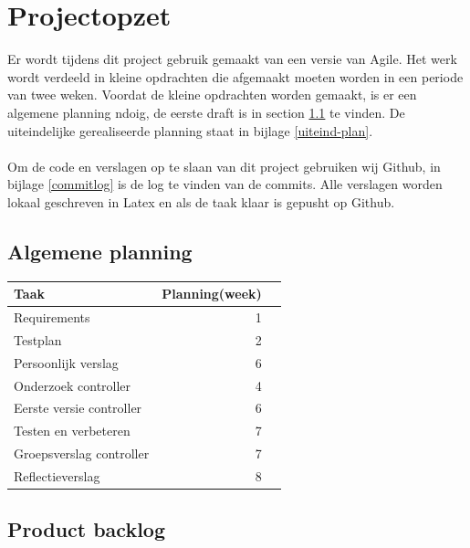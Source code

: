 \documentclass{article}
\begin{document}
\section{Projectopzet}
Er wordt tijdens dit project gebruik gemaakt van een versie van Agile. Het werk wordt verdeeld in kleine opdrachten die afgemaakt moeten worden in een periode van twee weken. Voordat de kleine opdrachten worden gemaakt, is er een algemene planning ndoig, de eerste draft is in section \ref{eerste-draft} te vinden. De uiteindelijke gerealiseerde planning staat in bijlage \ref{uiteind-plan}.\\\\
Om de code en verslagen op te slaan van dit project gebruiken wij Github, in bijlage \ref{commitlog} is de log te vinden van de commits. Alle verslagen worden lokaal geschreven in Latex en als de taak klaar is gepusht op Github.

\subsection{Algemene planning}
\label{eerste-draft}
\begin{table}[h!]
\begin{tabularx}{\textwidth}{l r r}
 \textbf{Taak} & \textbf{Planning(week)}  \\ \hline
 Requirements & 1 \\
 Testplan & 2  \\
 Persoonlijk verslag & 6 \\
 Onderzoek controller & 4 \\
 Eerste versie controller & 6  \\
 Testen en verbeteren & 7  \\
 Groepsverslag controller & 7  \\
 Reflectieverslag & 8  \\
\end{tabularx}
\end{table}

\newpage

\subsection*{Product backlog}
\end{document}
